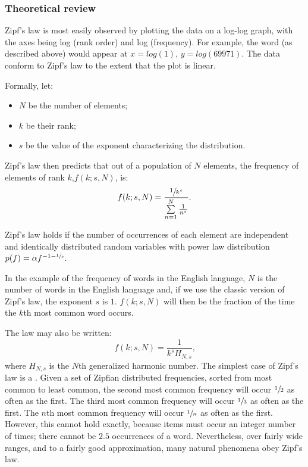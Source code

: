     \subsubsection{Theoretical review}

      Zipf's law is most easily observed by plotting the data on a log-log graph, with the axes being log (rank order) and log (frequency). For example, the word  (as described above) would appear at $x = log(1)$, $y = log(69971)$. The data conform to Zipf's law to the extent that the plot is linear.
      
      Formally, let:
      \begin{itemize}
        \item $N$ be the number of elements;
        \item $k$ be their rank;
        \item $s$ be the value of the exponent characterizing the distribution.
      \end{itemize}
      Zipf's law then predicts that out of a population of $N$ elements, the frequency of elements of rank $k\mbox{,} f(k;s,N)$, is:
      \begin{equation}
        f(k;s,N)=\frac{\sfrac{1}{k^s}}{\sum\limits_{n=1}^N \frac{1}{n^s}}\mbox{.}
      \end{equation}

      Zipf's law holds if the number of occurrences of each element are independent and identically distributed random variables with power law distribution $p(f) = \alpha f^{-1-\sfrac{1}{s}}$.\cite{AdamicHuberman2002}

      In the example of the frequency of words in the English language, $N$ is the number of words in the English language and, if we use the classic version of Zipf's law, the exponent $s$ is $1$. $f(k; s,N)$ will then be the fraction of the time the $k$th most common word occurs.

      The law may also be written:
      \begin{equation}
        f(k;s,N)=\frac{1}{k^s H_{N,s}}\mbox{,}
      \end{equation}
      where $H_{N,s}$ is the $N$th generalized harmonic number.
The simplest case of Zipf's law is a . Given a set of Zipfian distributed frequencies, sorted from most common to least common, the second most common frequency will occur $\sfrac{1}{2}$ as often as the first. The third most common frequency will occur $\sfrac{1}{3}$ as often as the first. The $n$th most common frequency will occur $\sfrac{1}{n}$ as often as the first. However, this cannot hold exactly, because items must occur an integer number of times; there cannot be $2.5$ occurrences of a word. Nevertheless, over fairly wide ranges, and to a fairly good approximation, many natural phenomena obey Zipf's law.

